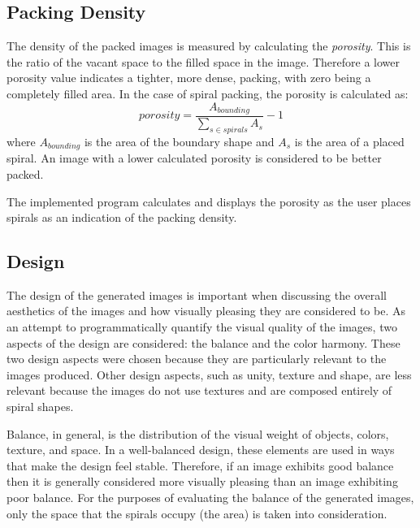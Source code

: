 \documentclass[11pt]{IEEEtran}
\begin{document}
\subsection{Packing Density}
The density of the packed images is measured by calculating the \textit{porosity}. This is the ratio of the vacant space to the filled space in the image. Therefore a lower porosity value indicates a tighter, more dense, packing, with zero being a completely filled area. In the case of spiral packing, the porosity is calculated as: 
\begin{equation} 
porosity = \frac{A_{bounding}}{\sum_{s \in spirals}A_{s}} - 1
\end{equation}
where $A_{bounding}$ is the area of the boundary shape and $A_{s}$ is the area of a placed spiral. An image with a lower calculated porosity is considered to be better packed. 

The implemented program calculates and displays the porosity as the user places spirals as an indication of the packing density.

\subsection{Design}
The design of the generated images is important when discussing the overall aesthetics of the images and how visually pleasing they are considered to be. As an attempt to programmatically quantify the visual quality of the images, two aspects of the design are considered: the balance and the color harmony. These two design aspects were chosen because they are particularly relevant to the images produced. Other design aspects, such as unity, texture and shape, are less relevant because the images do not use textures and are composed entirely of spiral shapes.

Balance, in general, is the distribution of the visual weight of objects, colors, texture, and space. In a well-balanced design, these elements are used in ways that make the design feel stable. Therefore, if an image exhibits good balance then it is generally considered more visually pleasing than an image exhibiting poor balance. For the purposes of evaluating the balance of the generated images, only the space that the spirals occupy (the area) is taken into consideration.
\end{document}
